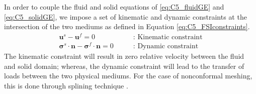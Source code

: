 In order to couple the fluid and solid equations of \eqref{eq:C5_fluidGE} and \eqref{eq:C5_solidGE}, we impose a set of kinematic and dynamic constraints \cite{van2007comparison} at the intersection of the two mediums as defined in Equation \eqref{eq:C5_FSIconstraints}.
%
\begin{subequations}\label{eq:C5_FSIconstraints}
\begin{align}
	\mathbf{u}^s - \mathbf{u}^f = 0
	\quad \quad &\text{: Kinematic constraint}
	\\
	\mathbf{\sigma}^s \cdot \mathbf{n} - \mathbf{\sigma}^f \cdot \mathbf{n} = 0
	\quad \quad &\text{: Dynamic constraint}
\end{align}
\end{subequations}
%
The kinematic constraint will result in zero relative velocity between the fluid and solid domain; whereas, the dynamic constraint will lead to the transfer of loads between the two physical mediums. For the case of nonconformal meshing, this is done through splining technique \cite{hounjet1995evaluation}.
